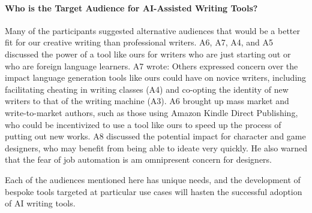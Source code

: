 % 




\paragraph{Who is the Target Audience for AI-Assisted Writing Tools?}
Many of the participants suggested alternative audiences that would be a better fit for our creative writing than professional writers.
A6, A7, A4, and A5 discussed the power of a tool like ours for writers who are just starting out or who are foreign language learners.
A7 wrote: 
Others expressed concern over the impact language generation tools like ours could have on novice writers, including facilitating cheating in writing classes (A4) and co-opting the identity of new writers to that of the writing machine (A3).
A6 brought up mass market and write-to-market authors, such as those using Amazon Kindle Direct Publishing, who could be incentivized to use a tool like ours to speed up the process of putting out new works.
A8 discussed the potential impact for character and game designers, who may benefit from being able to ideate very quickly.
He also warned that the fear of job automation is am omnipresent concern for designers.

Each of the audiences mentioned here has unique needs, and the development of bespoke tools targeted at particular use cases will hasten the successful adoption of AI writing tools.





